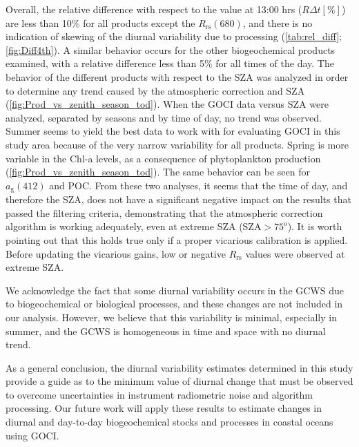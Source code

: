 \documentclass[remotesensing,article,submit,moreauthors,pdftex,10pt,a4paper]{Definitions/mdpi}
\begin{document}
Overall, the relative difference with respect to the value at 13:00 hrs ($R\Delta t[\%]$) are less than 10\% for all products except the $R_\text{rs}(680)$, and there is no indication of skewing of the diurnal variability due to processing (\autoref{tab:rel_diff}; \autoref{fig:Diff4th}). A similar behavior occurs for the other biogeochemical products examined, with a relative difference less than 5\% for all times of the day. The behavior of the different products with respect to the SZA was analyzed in order to determine any trend caused by the atmospheric correction and SZA (\autoref{fig:Prod_vs_zenith_season_tod}). When the GOCI data versus SZA were analyzed, separated by seasons and by time of day, no trend was observed. Summer seems to yield the best data to work with for evaluating GOCI in this study area because of the very narrow variability for all products. Spring is more variable in the Chl-a levels, as a consequence of phytoplankton production (\autoref{fig:Prod_vs_zenith_season_tod}). The same behavior can be seen for $a_\text{g}(412)$ and POC. From these two analyses, it seems that the time of day, and therefore the SZA, does not have a significant negative impact on the results that passed the filtering criteria, demonstrating that the atmospheric correction algorithm is working adequately, even at extreme SZA (SZA$>75^o$). It is worth pointing out that this holds true only if a proper vicarious calibration is applied. Before updating the vicarious gains, low or negative $R_\text{rs}$ values were observed at extreme SZA.

We acknowledge the fact that some diurnal variability occurs in the GCWS due to biogeochemical or biological processes, and these changes are not included in our analysis. However, we believe that this variability is minimal, especially in summer, and the GCWS is homogeneous in time and space with no diurnal trend. 

As a general conclusion, the diurnal variability estimates determined in this study provide a guide as to the minimum value of diurnal change that must be  observed to overcome uncertainties in instrument radiometric noise and algorithm processing. Our future work will apply these results to estimate changes in diurnal and day-to-day biogeochemical stocks and processes in coastal oceans using GOCI. 

\vspace{6pt} 

\end{document}
